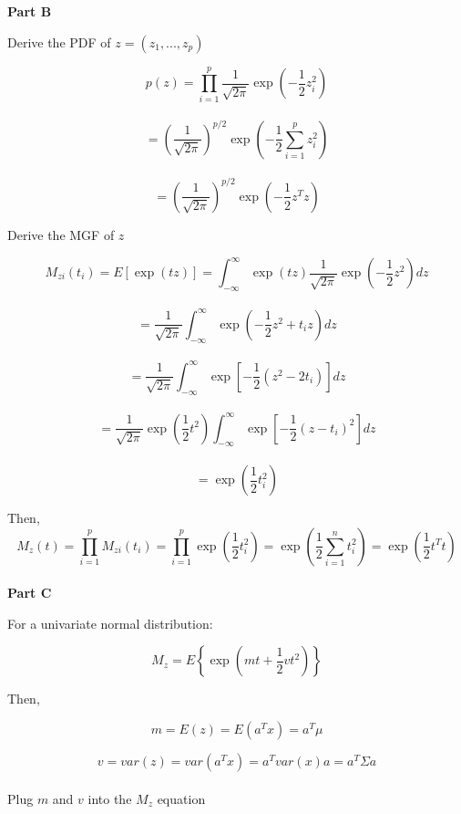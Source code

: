 \documentclass[12pt]{amsart}
\begin{document}
{\bf Part B}\\
\bigskip

Derive the PDF of $z = (z_1, ..., z_p)$

$$p(z) = \prod_{i=1}^{p}\frac{1}{\sqrt{2\pi}}\exp\left(-\frac{1}{2}z_i^2\right) $$\\

$$=\left(\frac{1}{\sqrt{2\pi}} \right)^{p/2} \exp\left(-\frac{1}{2}\sum_{i=1}^{p} z_i^2\right) $$\\

$$ =\left(\frac{1}{\sqrt{2\pi}} \right)^{p/2} \exp\left(-\frac{1}{2} z^Tz\right) $$




Derive the MGF of $z$

$$M_{zi}(t_i) = E[\exp(tz)] =\int_{-\infty}^{\infty} \exp(tz) \frac{1}{\sqrt{2\pi}} \exp\left(-\frac{1}{2}z^2\right)dz $$\\


$$=\frac{1}{\sqrt{2\pi}}\int_{-\infty}^{\infty} \exp\left(-\frac{1}{2}z^2 +t_iz\right)dz $$\\

$$=\frac{1}{\sqrt{2\pi}}\int_{-\infty}^{\infty} \exp\left[-\frac{1}{2}(z^2 -2t_i)\right]dz $$\\

$$=\frac{1}{\sqrt{2\pi}}\exp\left(\frac{1}{2}t^2\right)\int_{-\infty}^{\infty} \exp\left[-\frac{1}{2}(z-t_i)^2\right]dz $$\\

$$=\exp\left(\frac{1}{2}t_i^2\right)$$


Then,\\

$$M_{z}(t) = \prod_{i=1}^{p} M_{zi}(t_i) =\prod_{i=1}^{p} \exp\left(\frac{1}{2}t_i^2\right) =\exp\left(\frac{1}{2}\sum_{i=1}^{n}t_i^2\right) =  \exp\left(\frac{1}{2}t^Tt\right)$$\\


{\bf Part C}\\
\bigskip

For a univariate normal distribution:


$$ M_z = E\left\{\exp\left(  mt + \frac{1}{2}vt^2   \right) \right\} $$

Then,

$$ m = E(z) = E(a^Tx) = a^T\mu $$

$$ v= var(z) = var(a^Tx) = a^Tvar(x)a = a^T \Sigma a $$\\

Plug $m$ and $v$ into the $M_z$ equation
\end{document}
